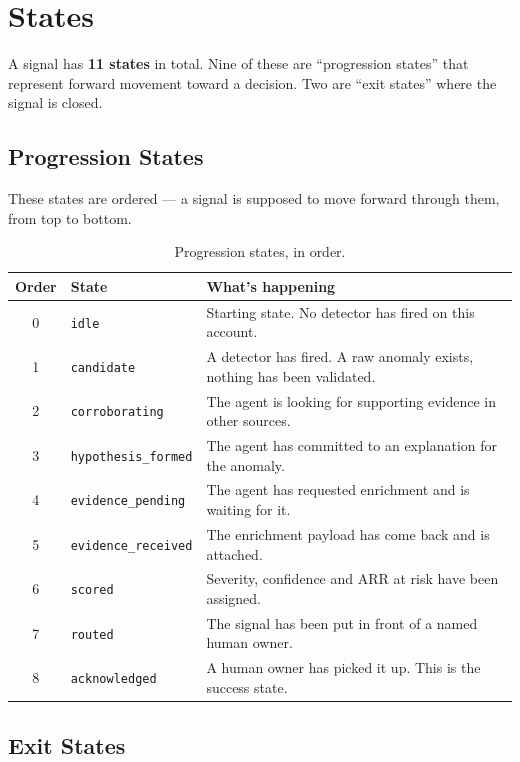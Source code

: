 \documentclass[11pt, a4paper]{article}
\begin{document}
\section{States}
\label{sec:states}

A signal has \textbf{11 states} in total. Nine of these are ``progression states'' that represent forward movement toward a decision. Two are ``exit states'' where the signal is closed.

\subsection{Progression States}

These states are ordered --- a signal is supposed to move forward through them, from top to bottom.

\begin{table}[h]
\centering
\begin{tabular}{clp{8cm}}
\toprule
\textbf{Order} & \textbf{State} & \textbf{What's happening} \\
\midrule
0 & \texttt{idle} & Starting state. No detector has fired on this account. \\
1 & \texttt{candidate} & A detector has fired. A raw anomaly exists, nothing has been validated. \\
2 & \texttt{corroborating} & The agent is looking for supporting evidence in other sources. \\
3 & \texttt{hypothesis\_formed} & The agent has committed to an explanation for the anomaly. \\
4 & \texttt{evidence\_pending} & The agent has requested enrichment and is waiting for it. \\
5 & \texttt{evidence\_received} & The enrichment payload has come back and is attached. \\
6 & \texttt{scored} & Severity, confidence and ARR at risk have been assigned. \\
7 & \texttt{routed} & The signal has been put in front of a named human owner. \\
8 & \texttt{acknowledged} & A human owner has picked it up. This is the success state. \\
\bottomrule
\end{tabular}
\caption{Progression states, in order.}
\label{tab:states}
\end{table}

\subsection{Exit States}
\end{document}
